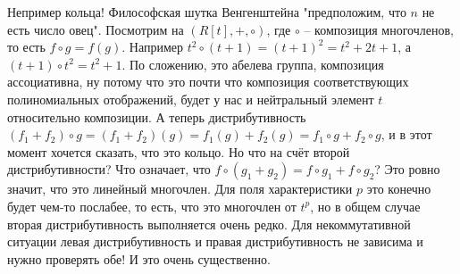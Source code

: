 \begin{itemize}
        Непример кольца! Философская шутка Венгенштейна "предположим, что $n$
        не есть число овец". Посмотрим на $(R[t], +, \circ)$, где $\circ$ –
        композиция многочленов, то есть $f\circ g = f(g)$. Например $t^2\circ
        (t+1)=(t+1)^2=t^2+2t+1$, а $(t+1)\circ t^2=t^2+1$. По сложению, это
        абелева группа, композиция ассоциативна, ну потому что это почти что
        композиция соответствующих полиномиальных отображений, будет у нас и
        нейтральный элемент $t$ относительно композиции. А теперь
        дистрибутивность $(f_1+f_2)\circ g=(f_1+f_2)(g)=f_1(g)+f_2(g)=f_1\circ
        g + f_2\circ g$, и в этот момент хочется сказать, что это кольцо. Но
        что на счёт второй дистрибутивности? Что означает, что $f\circ(g_1+g_2)
        =f\circ g_1 + f\circ g_2$? Это ровно значит, что это линейный многочлен.
        Для поля характеристики $p$ это конечно будет чем-то послабее, то есть,
        что это многочлен от $t^p$, но в общем случае вторая дистрибутивность
        выполняется очень редко. Для некоммутативной ситуации левая
        дистрибутивность и правая дистрибутивность не зависима и нужно
        проверять обе! И это очень существенно.
\end{itemize}

